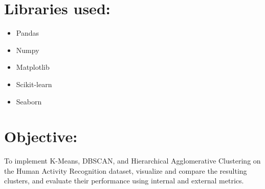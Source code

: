 \documentclass[11pt]{article}
\begin{document}
\vspace{0.3cm}
\noindent
\section{Libraries used:}
\begin{itemize}
    \item {Pandas}
    \item {Numpy}
    \item {Matplotlib}
    \item {Scikit-learn}
    \item {Seaborn}
\end{itemize}

\vspace{0.3cm}
\noindent
\section{Objective:} 
To implement K-Means, DBSCAN, and Hierarchical Agglomerative Clustering on the Human Activity Recognition dataset, visualize and compare the resulting clusters, and evaluate their performance using internal and external metrics.
\end{document}
